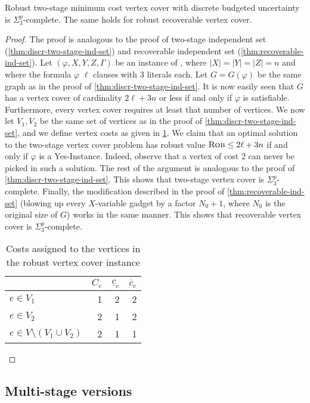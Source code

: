 \documentclass[a4paper,abstracton]{scrartcl}
\begin{document}
\begin{theorem}
\label{thm:two-stage-and-recoverable-vertex-cover}
Robust two-stage minimum cost vertex cover with discrete budgeted uncertainty is $\Sigma_3^p$-complete. The same holds for robust recoverable vertex cover.
\end{theorem}
\begin{proof}
The proof is analogous to the proof of two-stage independent set (\cref{thm:discr-two-stage-ind-set}) and recoverable independent set (\cref{thm:recoverable-ind-set}). 
Let $(\varphi,X,Y,Z,\Gamma)$ be an instance of {\radj}, where $|X| = |Y| = |Z| = n$ and where the formula $\varphi$  $\ell$ clauses with 3 literals each.
 Let $G = G(\varphi)$ be the same graph as in the proof of \cref{thm:discr-two-stage-ind-set}. 
It is now easily seen that $G$ has a vertex cover of cardinality $2\ell + 3n$ or less if and only if $\varphi$ is satisfiable. 
Furthermore, every vertex cover requires at least that number of vertices. 
We now let $V_1, V_2$ be the same set of vertices as in the proof of \cref{thm:discr-two-stage-ind-set}, and we define vertex costs as given in \cref{table:vertex-cover}. 
We claim that an optimal solution to the two-stage vertex cover problem has robust value $\textsc{Rob} \leq 2\ell + 3n$ if and only if $\varphi$ is a Yes-Instance. 
Indeed, observe that a vertex of cost 2 can never be picked in such a solution. The rest of the argument is analogous to the proof of \cref{thm:discr-two-stage-ind-set}. 
This shows that two-stage vertex cover is $\Sigma_3^p$-complete. 
Finally, the modification described in the proof of \cref{thm:recoverable-ind-set} (blowing up every $X$-variable gadget by a factor $N_0+1$, where $N_0$ is the original size of $G$) works in the same manner. 
This shows that recoverable vertex cover is $\Sigma_3^p$-complete.
\begin{table}
\centering
\begin{tabular}{l|rrr}
& $C_e$ & $\underline{c}_e$ & $\overline{c}_e$ \\
\hline
$e \in V_1$ & 1 & 2 & 2 \\
$e \in V_2$ & 2 & 1 & 2 \\
$e \in V \setminus (V_1 \cup V_2)$ & 2 & 1 & 1 
\end{tabular}
\caption{Costs assigned to the vertices in the robust vertex cover instance}
\label{table:vertex-cover}
\end{table}
\end{proof}


\subsection{Multi-stage versions}
\label{subsec:multistage}
\end{document}
